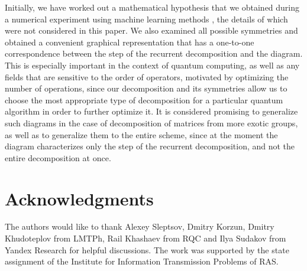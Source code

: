 \documentclass[a4paper, openany, 12pt]{article}
\theoremstyle{remark}
\theoremstyle{definition}
\begin{document}
Initially, we have worked out a mathematical hypothesis that we obtained during a numerical experiment using machine learning methods \cite{FedinMorozov_unpublished}, the details of which were not considered in this paper.  We also examined all possible symmetries and obtained a convenient graphical representation that has a one-to-one correspondence between the step of the recurrent decomposition and the diagram. This is especially important in the context of quantum computing, as well as any fields that are sensitive to the order of operators, motivated by optimizing the number of operations, since our decomposition and its symmetries allow us to choose the most appropriate type of decomposition for a particular quantum algorithm in order to further optimize it. It is considered promising to generalize such diagrams in the case of decomposition of matrices from more exotic groups, as well as to generalize them to the entire scheme, since at the moment the diagram characterizes only the step of the recurrent decomposition, and not the entire decomposition at once.

\section{Acknowledgments}
The authors would like to thank Alexey Sleptsov, Dmitry Korzun, Dmitry Khudoteplov from LMTPh, Rail Khashaev from RQC and Ilya Sudakov from Yandex Research for helpful discussions. The work was supported by the state assignment of the Institute for Information Transmission Problems of RAS.


\newpage
\end{document}

